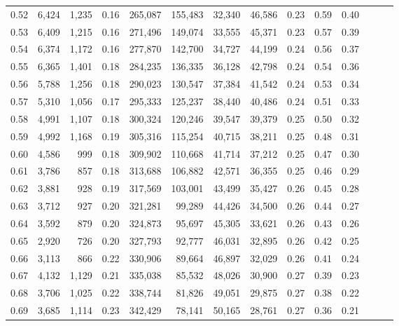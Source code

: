 \begin{tabular}{rrrrrrrrrrrrrr}
0.52 &   6,424 &  1,235 &  0.16 &  265,087 &  155,483 &  32,340 &  46,586 &  0.23 &  0.59 &      0.40 \\
0.53 &   6,409 &  1,215 &  0.16 &  271,496 &  149,074 &  33,555 &  45,371 &  0.23 &  0.57 &      0.39 \\
0.54 &   6,374 &  1,172 &  0.16 &  277,870 &  142,700 &  34,727 &  44,199 &  0.24 &  0.56 &      0.37 \\
0.55 &   6,365 &  1,401 &  0.18 &  284,235 &  136,335 &  36,128 &  42,798 &  0.24 &  0.54 &      0.36 \\
0.56 &   5,788 &  1,256 &  0.18 &  290,023 &  130,547 &  37,384 &  41,542 &  0.24 &  0.53 &      0.34 \\
0.57 &   5,310 &  1,056 &  0.17 &  295,333 &  125,237 &  38,440 &  40,486 &  0.24 &  0.51 &      0.33 \\
0.58 &   4,991 &  1,107 &  0.18 &  300,324 &  120,246 &  39,547 &  39,379 &  0.25 &  0.50 &      0.32 \\
0.59 &   4,992 &  1,168 &  0.19 &  305,316 &  115,254 &  40,715 &  38,211 &  0.25 &  0.48 &      0.31 \\
0.60 &   4,586 &    999 &  0.18 &  309,902 &  110,668 &  41,714 &  37,212 &  0.25 &  0.47 &      0.30 \\
0.61 &   3,786 &    857 &  0.18 &  313,688 &  106,882 &  42,571 &  36,355 &  0.25 &  0.46 &      0.29 \\
0.62 &   3,881 &    928 &  0.19 &  317,569 &  103,001 &  43,499 &  35,427 &  0.26 &  0.45 &      0.28 \\
0.63 &   3,712 &    927 &  0.20 &  321,281 &   99,289 &  44,426 &  34,500 &  0.26 &  0.44 &      0.27 \\
0.64 &   3,592 &    879 &  0.20 &  324,873 &   95,697 &  45,305 &  33,621 &  0.26 &  0.43 &      0.26 \\
0.65 &   2,920 &    726 &  0.20 &  327,793 &   92,777 &  46,031 &  32,895 &  0.26 &  0.42 &      0.25 \\
0.66 &   3,113 &    866 &  0.22 &  330,906 &   89,664 &  46,897 &  32,029 &  0.26 &  0.41 &      0.24 \\
0.67 &   4,132 &  1,129 &  0.21 &  335,038 &   85,532 &  48,026 &  30,900 &  0.27 &  0.39 &      0.23 \\
0.68 &   3,706 &  1,025 &  0.22 &  338,744 &   81,826 &  49,051 &  29,875 &  0.27 &  0.38 &      0.22 \\
0.69 &   3,685 &  1,114 &  0.23 &  342,429 &   78,141 &  50,165 &  28,761 &  0.27 &  0.36 &      0.21 \\

\end{tabular}
